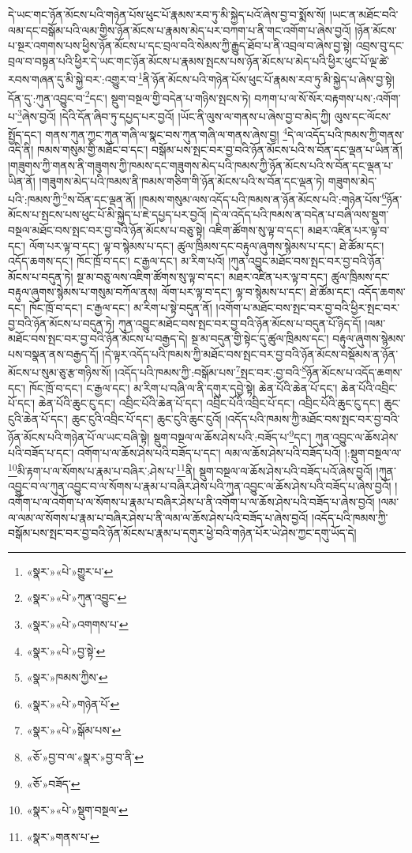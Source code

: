 དེ་ཡང་གང་ཉོན་མོངས་པའི་གཉེན་པོས་ཕུང་པོ་རྣམས་རབ་ཏུ་མི་སྐྱེད་པའོ་ཞེས་བྱ་བ་སྨོས་སོ། །ཡང་ན་མཐོང་བའི་ལམ་དང་བསྒོམ་པའི་ལམ་གྱིས་ཉོན་མོངས་པ་རྣམས་མེད་པར་བཀག་པ་ནི་གང་འགོག་པ་ཞེས་བྱའོ། །ཉོན་མོངས་པ་སྔར་འགགས་པས་ཕྱིས་ཉོན་མོངས་པ་དང་བྲལ་བའི་སེམས་ཀྱི་རྒྱུད་ཐོབ་པ་ནི་འབྲལ་བ་ཞེས་བྱ་སྟེ། འབྲས་བུ་དང་བྲལ་བ་བསྟན་པའི་ཕྱིར་དེ་ཡང་གང་ཉོན་མོངས་པ་རྣམས་སྤངས་པས་ཉོན་མོངས་པ་མེད་པའི་ཕྱིར་ཕུང་པོ་ལྔ་ཚེ་རབས་གཞན་དུ་མི་སྐྱེ་བར་:འགྱུར་བ་\footnote{«སྣར་»«པེ་»གྱུར་པ་}ནི་ཉོན་མོངས་པའི་གཉེན་པོས་ཕུང་པོ་རྣམས་རབ་ཏུ་མི་སྐྱེད་པ་ཞེས་བྱ་སྟེ། དོན་དུ་:ཀུན་འབྱུང་བ་\footnote{«སྣར་»«པེ་»ཀུན་འབྱུང་}དང་། སྡུག་བསྔལ་གྱི་བདེན་པ་གཉིས་སྤངས་ཏེ། བཀག་པ་ལ་སོ་སོར་བརྟགས་པས་:འགོག་པ་\footnote{«སྣར་»«པེ་»འགགས་པ་}ཞེས་བྱའོ། །དེའི་དོན་ཞིབ་ཏུ་དཔྱད་པར་བྱའོ། །ཡོང་ནི་ལུས་ལ་གནས་པ་ཞེས་བྱ་བ་མེད་ཀྱི། ལུས་དང་ལོངས་སྤྱོད་དང་། གནས་ཀུན་ཀྱང་ཀུན་གཞི་ལ་སྣང་བས་ཀུན་གཞི་ལ་གནས་ཞེས་བྱ། \footnote{«སྣར་»«པེ་»བྱ་སྟེ་}དེ་ལ་འདོད་པའི་ཁམས་ཀྱི་གནས་འདི་ནི། ཁམས་གསུམ་གྱི་མཐོང་བ་དང་། བསྒོམ་པས་སྤང་བར་བྱ་བའི་ཉོན་མོངས་པའི་ས་བོན་དང་ལྡན་པ་ཡིན་ནོ། །གཟུགས་ཀྱི་གནས་ནི་གཟུགས་ཀྱི་ཁམས་དང་གཟུགས་མེད་པའི་ཁམས་ཀྱི་ཉོན་མོངས་པའི་ས་བོན་དང་ལྡན་པ་ཡིན་ནོ། །གཟུགས་མེད་པའི་ཁམས་ནི་ཁམས་གཅིག་གི་ཉོན་མོངས་པའི་ས་བོན་དང་ལྡན་ཏེ། གཟུགས་མེད་པའི་:ཁམས་ཀྱི་\footnote{«སྣར་»ཁམས་ཀྱིས་}ས་བོན་དང་ལྡན་ནོ། །ཁམས་གསུམ་ལས་འདོད་པའི་ཁམས་ན་ཉོན་མོངས་པའི་:གཉེན་པོས་\footnote{«སྣར་»«པེ་»གཉེན་པོ་}ཉོན་མོངས་པ་སྤངས་པས་ཕུང་པོ་མི་སྐྱེད་པ་ཇེ་དཔྱད་པར་བྱའོ། །དེ་ལ་འདོད་པའི་ཁམས་ན་བདེན་པ་བཞི་ལས་སྡུག་བསྔལ་མཐོང་བས་སྤང་བར་བྱ་བའི་ཉོན་མོངས་པ་བཅུ་སྟེ། འཇིག་ཚོགས་སུ་ལྟ་བ་དང་། མཐར་འཛིན་པར་ལྟ་བ་དང་། ལོག་པར་ལྟ་བ་དང་། ལྟ་བ་སྙེམས་པ་དང་། ཚུལ་ཁྲིམས་དང་བརྟུལ་ཞུགས་སྙེམས་པ་དང་། ཐེ་ཚོམ་དང་། འདོད་ཆགས་དང་། ཁོང་ཁྲོ་བ་དང་། ང་རྒྱལ་དང་། མ་རིག་པའོ། །ཀུན་འབྱུང་མཐོང་བས་སྤང་བར་བྱ་བའི་ཉོན་མོངས་པ་བདུན་ཏེ། སྔ་མ་བཅུ་ལས་འཇིག་ཚོགས་སུ་ལྟ་བ་དང་། མཐར་འཛིན་པར་ལྟ་བ་དང་། ཚུལ་ཁྲིམས་དང་བརྟུལ་ཞུགས་སྙེམས་པ་གསུམ་བཀོལ་ནས། ལོག་པར་ལྟ་བ་དང་། ལྟ་བ་སྙེམས་པ་དང་། ཐེ་ཚོམ་དང་། འདོད་ཆགས་དང་། ཁོང་ཁྲོ་བ་དང་། ང་རྒྱལ་དང་། མ་རིག་པ་སྟེ་བདུན་ནོ། །འགོག་པ་མཐོང་བས་སྤང་བར་བྱ་བའི་ཕྱིར་སྤང་བར་བྱ་བའི་ཉོན་མོངས་པ་བདུན་ཏེ། ཀུན་འབྱུང་མཐོང་བས་སྤང་བར་བྱ་བའི་ཉོན་མོངས་པ་བདུན་པོ་ཉིད་དོ། །ལམ་མཐོང་བས་སྤང་བར་བྱ་བའི་ཉོན་མོངས་པ་བརྒྱད་དེ། སྔ་མ་བདུན་གྱི་སྟེང་དུ་ཚུལ་ཁྲིམས་དང་། བརྟུལ་ཞུགས་སྙེམས་པས་བསྣན་ནས་བརྒྱད་དོ། །དེ་ལྟར་འདོད་པའི་ཁམས་ཀྱི་མཐོང་བས་སྤང་བར་བྱ་བའི་ཉོན་མོངས་བསྡོམས་ན་ཉོན་མོངས་པ་སུམ་ཅུ་རྩ་གཉིས་སོ། །འདོད་པའི་ཁམས་ཀྱི་:བསྒོམ་པས་\footnote{«སྣར་»«པེ་»སྒོམ་པས་}སྤང་བར་:བྱ་བའི་\footnote{«ཅོ་»བྱ་བ་ལ་«སྣར་»བྱ་བ་ནི་}ཉོན་མོངས་པ་འདོད་ཆགས་དང་། ཁོང་ཁྲོ་བ་དང་། ང་རྒྱལ་དང་། མ་རིག་པ་བཞི་ལ་ནི་དགུར་དབྱེ་སྟེ། ཆེན་པོའི་ཆེན་པོ་དང་། ཆེན་པོའི་འབྲིང་པོ་དང་། ཆེན་པོའི་ཆུང་ངུ་དང་། འབྲིང་པོའི་ཆེན་པོ་དང་། འབྲིང་པོའི་འབྲིང་པོ་དང་། འབྲིང་པོའི་ཆུང་ངུ་དང་། ཆུང་ངུའི་ཆེན་པོ་དང་། ཆུང་ངུའི་འབྲིང་པོ་དང་། ཆུང་ངུའི་ཆུང་ངུའོ། །འདོད་པའི་ཁམས་ཀྱི་མཐོང་བས་སྤང་བར་བྱ་བའི་ཉོན་མོངས་པའི་གཉེན་པོ་ལ་ཡང་བཞི་སྟེ། སྡུག་བསྔལ་ལ་ཆོས་ཤེས་པའི་:བཟོད་པ་\footnote{«ཅོ་»བཟོད་}དང་། ཀུན་འབྱུང་ལ་ཆོས་ཤེས་པའི་བཟོད་པ་དང་། འགོག་པ་ལ་ཆོས་ཤེས་པའི་བཟོད་པ་དང་། ལམ་ལ་ཆོས་ཤེས་པའི་བཟོད་པའོ། །:སྡུག་བསྔལ་ལ་\footnote{«སྣར་»«པེ་»སྡུག་བསྔལ་}མི་རྟག་པ་ལ་སོགས་པ་རྣམ་པ་བཞིར་:ཤེས་པ་\footnote{«སྣར་»གནས་པ་}ནི། སྡུག་བསྔལ་ལ་ཆོས་ཤེས་པའི་བཟོད་པའོ་ཞེས་བྱའོ། །ཀུན་འབྱུང་བ་ལ་ཀུན་འབྱུང་བ་ལ་སོགས་པ་རྣམ་པ་བཞིར་ཤེས་པའི་ཀུན་འབྱུང་ལ་ཆོས་ཤེས་པའི་བཟོད་པ་ཞེས་བྱའོ། །འགོག་པ་ལ་འགོག་པ་ལ་སོགས་པ་རྣམ་པ་བཞིར་ཤེས་པ་ནི་འགོག་པ་ལ་ཆོས་ཤེས་པའི་བཟོད་པ་ཞེས་བྱའོ། །ལམ་ལ་ལམ་ལ་སོགས་པ་རྣམ་པ་བཞིར་ཤེས་པ་ནི་ལམ་ལ་ཆོས་ཤེས་པའི་བཟོད་པ་ཞེས་བྱའོ། །འདོད་པའི་ཁམས་ཀྱི་བསྒོམ་པས་སྤང་བར་བྱ་བའི་ཉོན་མོངས་པ་རྣམ་པ་དགུར་ཕྱེ་བའི་གཉེན་པོར་ཡེ་ཤེས་ཀྱང་དགུ་ཡོད་དེ། 